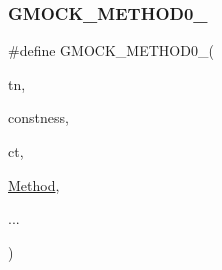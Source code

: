 \subsubsection{\texorpdfstring{GMOCK\_METHOD0\_}{GMOCK\_METHOD0\_}}
{\footnotesize\ttfamily \#define G\+M\+O\+C\+K\+\_\+\+M\+E\+T\+H\+O\+D0\+\_\+(\begin{DoxyParamCaption}\item[{}]{tn,  }\item[{}]{constness,  }\item[{}]{ct,  }\item[{}]{\mbox{\hyperlink{_obj__test_2lib_2googletest-release-1_88_81_2googlemock_2test_2gmock-spec-builders__test_8cc_a95606368148f3e5aab5db46c32466afd}{Method}},  }\item[{}]{... }\end{DoxyParamCaption})}

